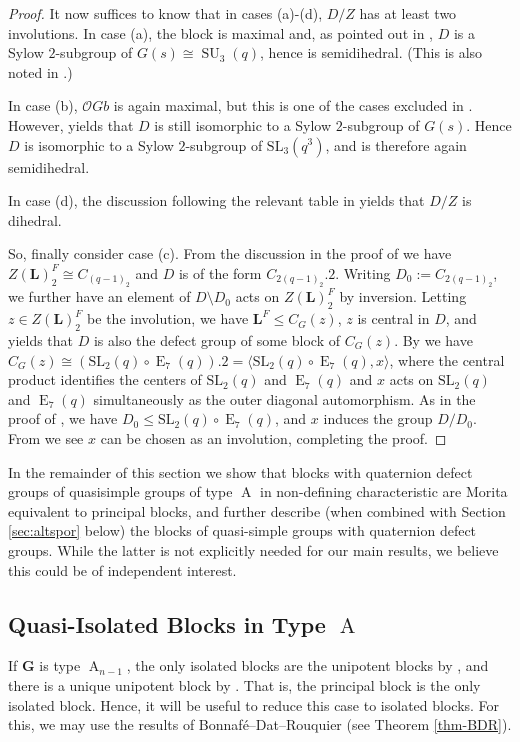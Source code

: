 \documentclass{amsart}
\theoremstyle{plain}\newtheorem{Theorem}{Theorem}[section]
\theoremstyle{plain}\newtheorem{Conjecture}[Theorem]{Conjecture}
\theoremstyle{plain}\newtheorem{Corollary}[Theorem]{Corollary}
\theoremstyle{plain}\newtheorem{Lemma}[Theorem]{Lemma}
\theoremstyle{plain}\newtheorem{Proposition}[Theorem]{Proposition}
\theoremstyle{definition}\newtheorem{Definition}[Theorem]{Definition}
\theoremstyle{definition}\newtheorem{Example}[Theorem]{Example}
\theoremstyle{definition}\newtheorem{Examples}[Theorem]{Examples}
\theoremstyle{definition}\newtheorem{Exercise}[Theorem]{Exercise}
\theoremstyle{definition}\newtheorem{Notation}[Theorem]{Notation}
\theoremstyle{definition}\newtheorem{Remark}[Theorem]{Remark}
\theoremstyle{definition}\newtheorem{Remarks}[Theorem]{Remarks}
\def\CO{{\mathcal{O}}}    \def\OPE{{\mathcal{O}(P\rtimes E)}}
\def\SL{\mathrm{SL}}
\newcommand{\bG}{{\mathbf{G}}}
\newcommand{\bL}{{\mathbf{L}}}
\newcommand{\type}{\operatorname}
\newcommand{\tA}{\type{A}}
\newcommand{\tE}{\type{E}}
\newcommand{\cent} {C}
\newcommand{\zent} {Z}
\numberwithin{equation}{section}
\begin{document}
\begin{proof}
It now suffices to know that in cases (a)-(d), $D/Z$ has at least two involutions.
In case (a), the block is maximal and, as pointed out in \cite[Thm.~6.1]{Ruh25}, $D$ is a Sylow $2$-subgroup of $G(s)\cong \operatorname{SU}_3(q)$, hence is semidihedral. (This is also noted in \cite{hiss}.)

In case (b), $\CO G b$ is again maximal, but this is one of the cases excluded in \cite[Thm.~6.1]{Ruh25}. However, \cite[Cor.~12.12]{Ruh25} yields that $D$ is still isomorphic to a Sylow $2$-subgroup of $G(s)$. Hence $D$ is isomorphic to a Sylow $2$-subgroup of $\SL_3(q^3)$, and is therefore again semidihedral. 

In case (d), the discussion following the relevant table in \cite{Eng00} yields that $D/Z$ is dihedral. 

So, finally consider case (c). From the discussion in the proof of \cite[Prop.~6.4]{KM13} we have $\zent(\bL)^F_2\cong C_{(q-1)_2}$ and $D$ is of the form $C_{2(q-1)_2}.2$. Writing $D_0:=C_{2(q-1)_2}$, we further have an element of $D\setminus D_0$ acts on $\zent(\bL)^F_2$ by inversion. Letting $z\in\zent(\bL)^F_2$ be the involution, we have $\bL^F\leq \cent_G(z)$, $z$ is central in $D$, and \cite[Prop.~4.15(c)]{AlperinBroue} yields that $D$ is also the defect group of some block of $\cent_G(z)$. By \cite[Tab.~4.5.1]{GLS3} we have $\cent_{G}(z)\cong (\SL_2(q)\circ\tE_7(q)).2=\langle \SL_2(q)\circ\tE_7(q), x\rangle$, where the central product identifies the centers of $\SL_2(q)$ and $\tE_7(q)$ and $x$ acts on $\SL_2(q)$ and $\tE_7(q)$ simultaneously as the outer diagonal automorphism. As in the proof of \cite[Prop.~6.4]{KM13}, we have $D_0\leq \SL_2(q)\circ\tE_7(q)$, and $x$ induces the group $D/D_0$. 
From \cite[Tab.~4.5.2]{GLS3} we see $x$ can be chosen as an involution, completing the proof.
\end{proof}

In the remainder of this section we show that blocks with quaternion defect groups of quasisimple groups of type $\tA$ in non-defining characteristic are Morita equivalent to principal blocks, and further describe (when combined with Section \ref{sec:altspor} below) the blocks of quasi-simple groups with quaternion defect groups. While the latter is not explicitly needed for our main results, we believe this could be of independent interest.

\subsection{Quasi-Isolated Blocks in Type $\tA$}\label{sec:typeAqi}
If $\bG$ is type $\tA_{n-1}$, the only isolated blocks are the unipotent blocks by \cite{bon}, and there is a unique unipotent block by \cite[Thm.~21.14]{CaEnbook}. That is, the principal block is the only isolated block. Hence, it will be useful to reduce this case to isolated blocks. For this, we may use the results of Bonnaf{\'e}--Dat--Rouquier \cite{BDR} (see Theorem \ref{thm-BDR}). 
\end{document}
